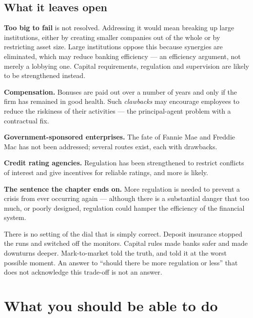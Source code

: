 \documentclass[11pt,a4paper]{article}
\newcommand{\keylab}[1]{\textcolor{ifclay}{\textbf{#1}}}
\begin{document}
\subsection*{What it leaves open}

\textbf{Too big to fail} is not resolved. Addressing it would mean breaking up
large institutions, either by creating smaller companies out of the whole or by
restricting asset size. Large institutions oppose this because synergies are
eliminated, which may reduce banking efficiency --- an efficiency argument, not
merely a lobbying one. Capital requirements, regulation and supervision are
likely to be strengthened instead.

\textbf{Compensation.} Bonuses are paid out over a number of years and only if
the firm has remained in good health. Such \emph{clawbacks} may encourage
employees to reduce the riskiness of their activities --- the principal-agent
problem with a contractual fix.

\textbf{Government-sponsored enterprises.} The fate of Fannie Mae and Freddie
Mac has not been addressed; several routes exist, each with drawbacks.

\textbf{Credit rating agencies.} Regulation has been strengthened to restrict
conflicts of interest and give incentives for reliable ratings, and more is
likely.

\begin{keybox}
\keylab{The sentence the chapter ends on.} More regulation is needed to prevent
a crisis from ever occurring again --- although there is a substantial danger
that too much, or poorly designed, regulation could hamper the efficiency of the
financial system.
\end{keybox}

There is no setting of the dial that is simply correct. Deposit insurance
stopped the runs and switched off the monitors. Capital rules made banks safer
and made downturns deeper. Mark-to-market told the truth, and told it at the
worst possible moment. An answer to ``should there be more regulation or less''
that does not acknowledge this trade-off is not an answer.

\section*{\color{ifteal}What you should be able to do}
\end{document}
